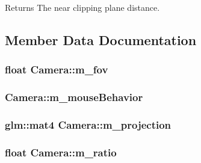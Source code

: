 \begin{DoxyReturn}{Returns}
The near clipping plane distance. 
\end{DoxyReturn}


\subsection{Member Data Documentation}
\hypertarget{classCamera_aa404a4e057fa16fb82ce8668d7a661b6}{
\subsubsection[{m\+\_\+fov}]{\setlength{\rightskip}{0pt plus 5cm}float Camera\+::m\+\_\+fov\hspace{0.3cm}{\ttfamily [private]}}}\label{classCamera_aa404a4e057fa16fb82ce8668d7a661b6}
\hypertarget{classCamera_a4aa308842db545da7732c5fe306be934}{
\subsubsection[{m\+\_\+mouse\+Behavior}]{ Camera\+::m\+\_\+mouse\+Behavior\hspace{0.3cm}{\ttfamily [private]}}}\label{classCamera_a4aa308842db545da7732c5fe306be934}
\hypertarget{classCamera_a32746f033de65f9bf0d3e6823b77f339}{
\subsubsection[{m\+\_\+projection}]{\setlength{\rightskip}{0pt plus 5cm}glm\+::mat4 Camera\+::m\+\_\+projection\hspace{0.3cm}{\ttfamily [private]}}}\label{classCamera_a32746f033de65f9bf0d3e6823b77f339}
\hypertarget{classCamera_aac7338a3de62c4f1b78a5553ae642c27}{
\subsubsection[{m\+\_\+ratio}]{\setlength{\rightskip}{0pt plus 5cm}float Camera\+::m\+\_\+ratio\hspace{0.3cm}{\ttfamily [private]}}}\label{classCamera_aac7338a3de62c4f1b78a5553ae642c27}
